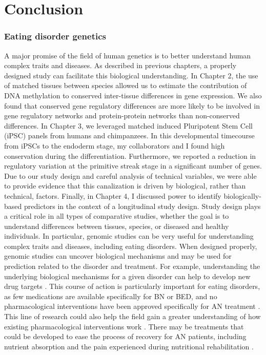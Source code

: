 \chapter{Conclusion}\label{conclusion}

\subsection{Eating disorder genetics}
A major promise of the field of human genetics is to better understand human complex traits and diseases. As described in previous chapters, a properly designed study can facilitate this biological understanding. In Chapter 2, the use of matched tissues between species allowed us to estimate the contribution of DNA methylation to conserved inter-tissue differences in gene expression. We also found that conserved gene regulatory differences are more likely to be involved in gene regulatory networks and protein-protein networks than non-conserved differences. In Chapter 3, we leveraged matched induced Pluripotent Stem Cell (iPSC) panels from humans and chimpanzees. In this developmental timecourse from iPSCs to the endoderm stage, my collaborators and I found high conservation during the differentiation. Furthermore, we reported a reduction in regulatory variation at the primitive streak stage in a significant number of genes. Due to our study design and careful analysis of technical variables, we were able to provide evidence that this canalization is driven by biological, rather than technical, factors. Finally, in Chapter 4, I discussed power to identify biologically-based predictors in the context of a longitudinal study design. 
Study design plays a critical role in all types of comparative studies, whether the goal is to understand differences between tissues, species, or diseased and healthy individuals. In particular, genomic studies can be very useful for understanding complex traits and diseases, including eating disorders. When designed properly, genomic studies can uncover biological mechanisms and may be used for prediction related to the disorder and treatment. For example, understanding the underlying biological mechanisms for a given disorder can help to develop new drug targets \cite{RN40}. This course of action is particularly important for eating disorders, as few medications are available specifically for BN or BED, and no pharmacological interventions have been approved specifically for AN treatment \cite{RN1060}. This line of research could also help the field gain a greater understanding of how existing pharmacological interventions work \cite{RN40}. There may be treatments that could be developed to ease the process of recovery for AN patients, including nutrient absorption and the pain experienced during nutritional rehabilitation \cite{RN1411}.
